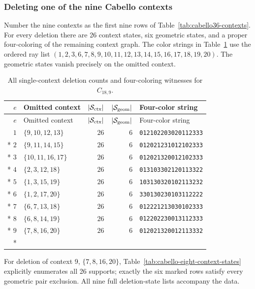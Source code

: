 \documentclass[aps,pra,reprint,superscriptaddress,longbibliography,nofootinbib,floatfix,10pt]{revtex4-2}
\theoremstyle{definition}
\begin{document}
\subsubsection{Deleting one of the nine Cabello contexts}
Number the nine contexts as the first nine rows of
Table~\ref{tab:cabello36-contexts}. For every deletion there are
26 context states, six geometric states, and a proper four-coloring
of the remaining context graph. The color strings in
Table~\ref{tab:cabello-context-deletions} use the ordered ray list $(1,2,3,6,7,8,9,10,11,12,13,14,15,16,17,18,19,20)$.
The geometric states vanish precisely on the omitted context.
\begingroup\small
{}
\begin{longtable}{rlrrl}
\caption{All single-context deletion counts and four-coloring witnesses for $C_{18,9}$.}\label{tab:cabello-context-deletions}\\
\toprule
$e$ & Omitted context & $|\mathcal S_{\rm ctx}|$ & $|\mathcal S_{\rm geom}|$ & Four-color string\\\midrule
\endfirsthead
\toprule
$e$ & Omitted context & $|\mathcal S_{\rm ctx}|$ & $|\mathcal S_{\rm geom}|$ & Four-color string\\\midrule
\endhead
\bottomrule\endfoot
$1$ & $\{9,10,12,13\}$ & $26$ & $6$ & \texttt{012102203020112333}\\*
$2$ & $\{9,11,14,15\}$ & $26$ & $6$ & \texttt{012021231012102333}\\*
$3$ & $\{10,11,16,17\}$ & $26$ & $6$ & \texttt{012021320012102333}\\*
$4$ & $\{2,3,12,18\}$ & $26$ & $6$ & \texttt{013103302120113322}\\*
$5$ & $\{1,3,15,19\}$ & $26$ & $6$ & \texttt{103130320102113232}\\*
$6$ & $\{1,2,17,20\}$ & $26$ & $6$ & \texttt{330130230103112222}\\*
$7$ & $\{6,7,13,18\}$ & $26$ & $6$ & \texttt{012221213030102333}\\*
$8$ & $\{6,8,14,19\}$ & $26$ & $6$ & \texttt{012202230013112333}\\*
$9$ & $\{7,8,16,20\}$ & $26$ & $6$ & \texttt{012021320012113332}\\*
\end{longtable}
\endgroup
For deletion of context 9, $\{7,8,16,20\}$,
Table~\ref{tab:cabello-eight-context-states} explicitly enumerates
all 26 supports; exactly the six marked rows satisfy every geometric
pair exclusion. All nine full deletion-state lists accompany the data.
\begingroup\small
{}
\end{document}
